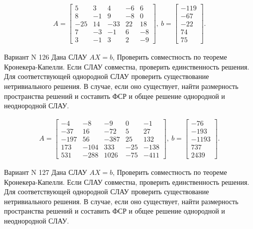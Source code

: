 \documentclass[11pt]{report}
\begin{document}
\begin{align*}
 A = \left[\begin{matrix}5 & 3 & 4 & -6 & 6\\8 & -1 & 9 & -8 & 0\\-25 & 14 & -33 & 22 & 18\\7 & -3 & -1 & 6 & -8\\3 & -1 & 3 & 2 & -9\end{matrix}\right],
\ b = \left[\begin{matrix}-119\\-67\\-22\\74\\75\end{matrix}\right]. 
 \end{align*}

Вариант N 126
Дана СЛАУ $AX = b$,
Проверить совместность по теореме Кронекера-Капелли. Если СЛАУ совместна, проверить единственность решения.
Для соответствующей однородной СЛАУ проверить существование нетривиального решения. В случае, если оно существует,
найти размерность пространства решений и составить ФСР и общее решение однородной  и неоднородной СЛАУ.


\begin{align*}
 A = \left[\begin{matrix}-4 & -8 & -9 & 0 & -1\\-37 & 16 & -72 & 5 & 27\\-197 & 56 & -387 & 25 & 132\\173 & -104 & 333 & -25 & -138\\531 & -288 & 1026 & -75 & -411\end{matrix}\right],
\ b = \left[\begin{matrix}-76\\-193\\-1193\\737\\2439\end{matrix}\right]. 
 \end{align*}

Вариант N 127
Дана СЛАУ $AX = b$,
Проверить совместность по теореме Кронекера-Капелли. Если СЛАУ совместна, проверить единственность решения.
Для соответствующей однородной СЛАУ проверить существование нетривиального решения. В случае, если оно существует,
найти размерность пространства решений и составить ФСР и общее решение однородной  и неоднородной СЛАУ.
\end{document}
